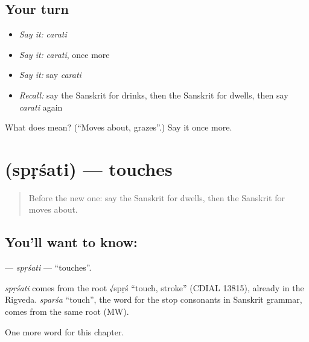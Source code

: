 \subsection*{Your turn}
\begin{itemize}
\raggedright
  \item \emph{Say it:} \emph{carati}
  \item \emph{Say it:} \emph{carati}, once more
  \item \emph{Say it:} say \emph{carati}
  \item \emph{Recall:} say the Sanskrit for drinks, then the Sanskrit for dwells, then say \emph{carati} again
\end{itemize}

\begin{tcolorbox}[breakable,colback=teal!4,colframe=teal!35!black,title={Before you move on}]
What does  mean? (\textquotedblleft{}Moves about, grazes\textquotedblright{}.) Say it once more.
\end{tcolorbox}
\section[\texorpdfstring{\sk{स्पृशति} (spṛśati)}{स्पृशति (spṛśati)}]{ (spṛśati) — touches}

\label{lesson:SA-C141-sprsati}



\begin{quote}
Before the new one: say the Sanskrit for dwells, then the Sanskrit for moves about.
\end{quote}

\subsection*{You'll want to know: }
\textbf{} — \emph{spṛśati} — \textquotedblleft{}touches\textquotedblright{}.

\begin{cousinweb}
\emph{spṛśati} comes from the root √spṛś \textquotedblleft{}touch, stroke\textquotedblright{} (CDIAL 13815), already in the Rigveda. \emph{sparśa} \textquotedblleft{}touch\textquotedblright{}, the word for the stop consonants in Sanskrit grammar, comes from the same root (MW).
\end{cousinweb}

\begin{grammarlens}[title={What you've built}]
One more word for this chapter.
\end{grammarlens}

